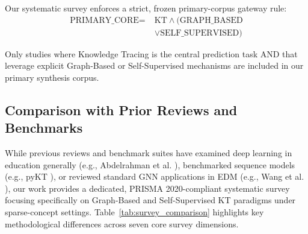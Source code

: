 \documentclass[10pt,journal,compsoc]{IEEEtran}
\begin{document}
Our systematic survey enforces a strict, frozen primary-corpus gateway rule:
\begin{equation}
\begin{split}
\text{PRIMARY\_CORE} = \; & \text{KT} \land (\text{GRAPH\_BASED} \\
& \lor \text{SELF\_SUPERVISED})
\end{split}
\end{equation}

Only studies where Knowledge Tracing is the central prediction task AND that leverage explicit Graph-Based or Self-Supervised mechanisms are included in our primary synthesis corpus.

\subsection{Comparison with Prior Reviews and Benchmarks}
While previous reviews and benchmark suites have examined deep learning in education generally (e.g., Abdelrahman et al. \cite{Abdelrahman_Survey_2023}), benchmarked sequence models (e.g., pyKT \cite{Liu_pyKT_2022}), or reviewed standard GNN applications in EDM (e.g., Wang et al. \cite{Wang_GraphKT_2024}), our work provides a dedicated, PRISMA 2020-compliant systematic survey focusing specifically on Graph-Based and Self-Supervised KT paradigms under sparse-concept settings. Table~\ref{tab:survey_comparison} highlights key methodological differences across seven core survey dimensions.
\end{document}
